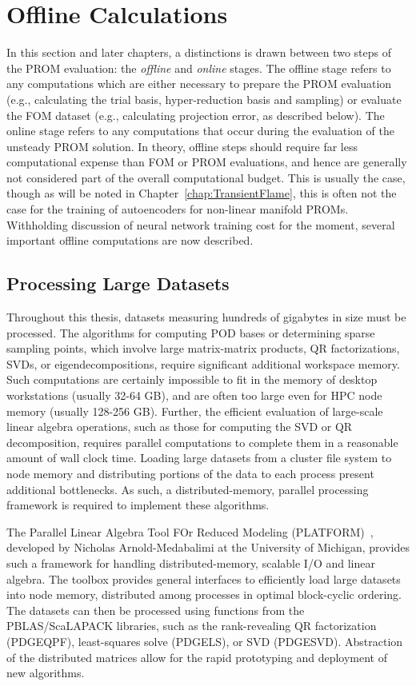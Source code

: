 \section{Offline Calculations}

In this section and later chapters, a distinctions is drawn between two steps of the PROM evaluation: the \textit{offline} and \textit{online} stages. The offline stage refers to any computations which are either necessary to prepare the PROM evaluation (e.g., calculating the trial basis, hyper-reduction basis and sampling) or evaluate the FOM dataset (e.g., calculating projection error, as described below). The online stage refers to any computations that occur during the evaluation of the unsteady PROM solution. In theory, offline steps should require far less computational expense than FOM or PROM evaluations, and hence are generally not considered part of the overall computational budget. This is usually the case, though as will be noted in Chapter~\ref{chap:TransientFlame}, this is often not the case for the training of autoencoders for non-linear manifold PROMs. Withholding discussion of neural network training cost for the moment, several important offline computations are now described.

\subsection{Processing Large Datasets}\label{sec:platform}
%
Throughout this thesis, datasets measuring hundreds of gigabytes in size must be processed. The algorithms for computing POD bases or determining sparse sampling points, which involve large matrix-matrix products, QR factorizations, SVDs, or eigendecompositions, require significant additional workspace memory. Such computations are certainly impossible to fit in the memory of desktop workstations (usually 32-64 GB), and are often too large even for HPC node memory (usually 128-256 GB). Further, the efficient evaluation of large-scale linear algebra operations, such as those for computing the SVD or QR decomposition, requires parallel computations to complete them in a reasonable amount of wall clock time. Loading large datasets from a cluster file system to node memory and distributing portions of the data to each process present additional bottlenecks. As such, a distributed-memory, parallel processing framework is required to implement these algorithms.

The Parallel Linear Algebra Tool FOr Reduced Modeling (PLATFORM)~\cite{PLATFORM}, developed by Nicholas Arnold-Medabalimi at the University of Michigan, provides such a framework for handling distributed-memory, scalable I/O and linear algebra. The toolbox provides general interfaces to efficiently load large datasets into node memory, distributed among processes in optimal block-cyclic ordering. The datasets can then be processed using functions from the PBLAS/ScaLAPACK libraries, such as the rank-revealing QR factorization (PDGEQPF), least-squares solve (PDGELS), or SVD (PDGESVD). Abstraction of the distributed matrices allow for the rapid prototyping and deployment of new algorithms.

